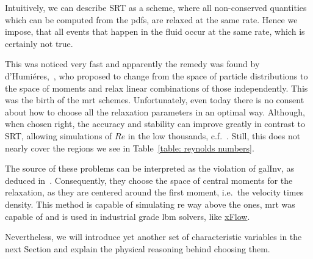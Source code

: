 Intuitively, we can describe SRT as a scheme, where all non-conserved quantities which can be computed from the \glspl{pdf}, are relaxed at the same rate.
Hence we impose, that all events that happen in the fluid occur at the same rate, which is certainly not true.

This was noticed very fast and apparently the remedy was found by d'Humiéres,~\cite{d1994generalized}, who proposed to change from the space of particle distributions to the space of moments and relax linear combinations of those independently.
This was the birth of the \gls{mrt} schemes.
Unfortunately, even today there is no consent about how to choose all the relaxation parameters in an optimal way.
Although, when chosen right, the accuracy and stability can improve greatly in contrast to SRT, allowing simulations of $Re$ in the low thousands, c.f.~\cite{d2002multiple}. Still, this does not nearly cover the regions we see in Table~\ref{table: reynolds numbers}.

The source of these problems can be interpreted as the violation of \gls{galInv}, as deduced in~\cite{geier2006cascaded}. Consequently, they choose the space of central moments for the relaxation, as they are centered around the first moment, i.e.\ the velocity times density.
This method is capable of simulating \gls{re} way above the ones, \gls{mrt} was capable of and is used in industrial grade \gls{lbm} solvers, like \href{http://www.xflowcfd.com/technology/view/cfd}{xFlow}.

Nevertheless, we will introduce yet another set of characteristic variables in the next Section and explain the physical reasoning behind choosing them.
